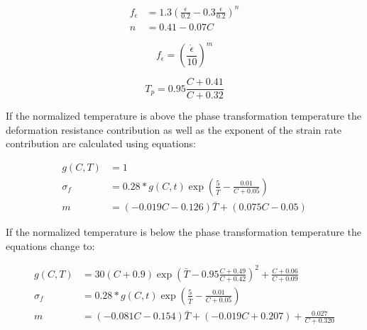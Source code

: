 \documentclass[11pt]{PyRollDocs}
\begin{document}
    \begin{equation}
        \begin{aligned}
            f_{\epsilon} &= 1.3 \left( \frac{\epsilon}{0.2} - 0.3 \frac{\epsilon}{0.2} \right)^n \\
            n &= 0.41-0.07 C
        \end{aligned}
        \label{eq:strain-contribution}
    \end{equation}

    \begin{equation}
        f_{\dot{\epsilon}} = \left( \frac{\dot{\epsilon}}{10} \right)^m
        \label{eq:strain-rate-contribution}
    \end{equation}

    \begin{equation}
        T_p = 0.95 \frac{C + 0.41}{C+ 0.32}
        \label{eq:phase-transformation-temperature}
    \end{equation}

    If the normalized temperature is above the phase transformation temperature the deformation resistance contribution as well as the exponent of the strain rate contribution are calculated using equations:

    \begin{equation}
        \begin{aligned}
            g(C,T) &= 1 \\
            \sigma_f &= 0.28 * g(C,t) \exp \left( \frac{5}{\bar{T}} - \frac{0.01}{C + 0.05} \right) \\
            m &= (-0.019C - 0.126)\bar{T} + (0.075C-0.05)
        \end{aligned}
        \label{eq:above-phase-transformation}
    \end{equation}

    If the normalized temperature is below the phase transformation temperature the equations change to:

    \begin{equation}
        \begin{aligned}
            g(C,T) &= 30 ( C +0.9) \exp \left( \bar{T} - 0.95 \frac{C + 0.49}{C +0.42} \right)^2 + \frac{C + 0.06}{C + 0.09} \\
            \sigma_f &= 0.28 * g(C,t) \exp \left( \frac{5}{\bar{T}} - \frac{0.01}{C + 0.05} \right) \\
            m &= (-0.081 C - 0.154) \bar{T} + (-0.019 C + 0.207) + \frac{0.027}{C+0.320}
        \end{aligned}
        \label{eq:below-phase-transformation}
    \end{equation}
\end{document}
